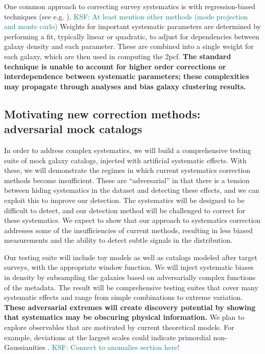 \documentclass[12pt, fullpage, letterpaper]{article}
\newcommand{\KSF}[1]{\textcolor{teal}{KSF: #1}}
\newcommand{\cf}{2pcf\xspace}
\begin{document}
One common approach to correcting survey systematics is with regression-based techniques (see e.g. \citealt{Ross2010}). \KSF{At least mention other methods (mode projection and monte carlo)}
Weights for important systematic parameters are determined by performing a fit, typically linear or quadratic, to adjust for dependencies between galaxy density and each parameter.
These are combined into a single weight for each galaxy, which are then used in computing the \cf.
\textbf{The standard technique is unable to account for higher order corrections or interdependence between systematic parameters; these complexities may propagate through analyses and bias galaxy clustering results.}

\subsection{Motivating new correction methods: adversarial mock catalogs}

In order to address complex systematics, we will build a comprehensive testing suite of mock galaxy catalogs, injected with artificial systematic effects.
With these, we will demonstrate the regimes in which current systematics correction methods become insufficient.
These are ``adversarial'' in that there is a tension between hiding systematics in the dataset and detecting these effects, and we can exploit this to improve our detection.
The systematics will be designed to be difficult to detect, and our detection method will be challenged to correct for these systematics. 
We expect to show that our approach to systematics correction addresses some of the insufficiencies of current methods, resulting in less biased measurements and the ability to detect subtle signals in the distribution.

Our testing suite will include toy models as well as catalogs modeled after target surveys, with the appropriate window function.
We will inject systematic biases in density by subsampling the galaxies based on adversarially complex functions of the metadata.
The result will be comprehensive testing suites that cover many systematic effects and range from simple combinations to extreme variation.
\textbf{These adversarial extremes will create discovery potential by showing that systematics may be obscuring physical information.}
We plan to explore observables that are motivated by current theoretical models.
For example, deviations at the largest scales could indicate primordial non-Gaussianities \citep{Dalal2008}. \KSF{Connect to anomalies section here!}
\end{document}
